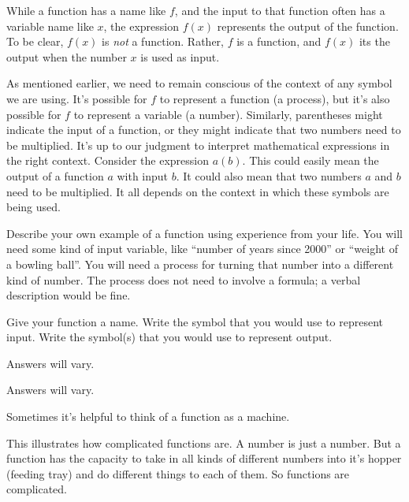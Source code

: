 %
\begin{specialnote}
While a function has a name like $f$, and the input to that function often
                	has a variable name like $x$, the expression $f(x)$ represents the output of
                	the function. To be clear, $f(x)$ is \emph{not} a function. Rather, $f$ is a
                	function, and $f(x)$ its the output when the number $x$ is used as input.\end{specialnote}
%
\par As mentioned earlier, we need to remain conscious of the context of any symbol we
       		are using. It's possible for $f$ to represent a function (a process), but it's also
       		possible for $f$ to represent a variable (a number). Similarly, parentheses might
       		indicate the input of a function, or they might indicate that two numbers need to
       		be multiplied. It's up to our judgment to interpret mathematical expressions in the
       		right context. Consider the expression $a(b)$. This could easily mean the output of
       		a function $a$ with input $b$. It could also mean that two numbers $a$ and $b$ need
       		to be multiplied. It all depends on the context in which these symbols are being used.
%
\begin{checkpoint}
\begin{problem}\label{}
Describe your own example of a function using experience from your life. You will need some 
				kind of input variable, like ``number of years since 2000'' or ``weight of a bowling ball''. You will 
				need a process for turning that number into a different kind of number. The process does not need to
                		involve a formula; a verbal description would be fine.
%
\par Give your function a name. Write the symbol that you would use to represent
                		input. Write the symbol(s) that you would use to represent output.
%
\begin{longsolution}
%
Answers will vary.
%
\end{longsolution}
%
\begin{shortsolution}
%
Answers will vary.
%
\end{shortsolution}
%
\end{problem}
%
\end{checkpoint}
%
\par Sometimes it's helpful to think of a function as a machine.
%
\par This illustrates how complicated functions are. A number is just a number. But a function has the capacity to 
		take in all kinds of different numbers into it's hopper (feeding tray) and do different things to each of them. So
		functions are complicated.
%
\typeout{************************************************}
\typeout{************************************************}
%

